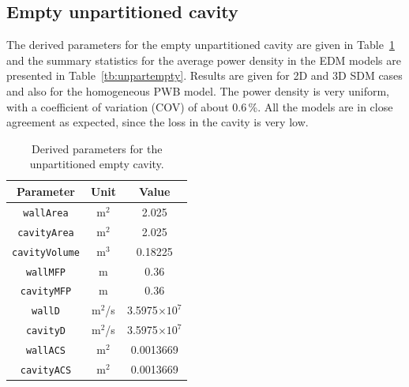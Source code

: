 \documentclass[a4paper]{article}
\numberwithin{equation}{section}
\newcounter{Table}
\begin{document}
\subsection[Empty unpartitioned cavity]{Empty unpartitioned cavity}
\label{sc:res:unpartempty}

The derived parameters for the empty unpartitioned cavity are given in Table~\ref{tb:derivparamsu} and the summary 
statistics for the average power density in the EDM models are presented in Table~\ref{tb:unpartempty}. 
Results are given for 2D and 3D SDM cases and also for the homogeneous PWB model. The power density is very 
uniform, with a coefficient of variation (COV) of about 0.6\,\%. All the models are in close agreement 
as expected, since the loss in the cavity is very low.

\begin{table}[ht]
\begin{center}
\begin{tabular}{|c|c|c|}
\hline
\textbf{Parameter}     &\textbf{Unit} &\textbf{Value}\\ 
\hline
\texttt{wallArea}      &m$^2$         &2.025              \\
\texttt{cavityArea}    &m$^2$         &2.025              \\
\texttt{cavityVolume}  &m$^3$         &0.18225            \\
\texttt{wallMFP}       &m             &0.36               \\
\texttt{cavityMFP}     &m             &0.36               \\
\texttt{wallD}         &m$^2$/s       &3.5975$\times10^7$ \\
\texttt{cavityD}       &m$^2$/s       &3.5975$\times10^7$ \\
\texttt{wallACS}       &m$^2$         &0.0013669          \\
\texttt{cavityACS}     &m$^2$         &0.0013669          \\
\hline
\end{tabular}
\end{center}
\caption{\label{tb:derivparamsu} Derived parameters for the unpartitioned empty cavity.}
\end{table}
\end{document}
